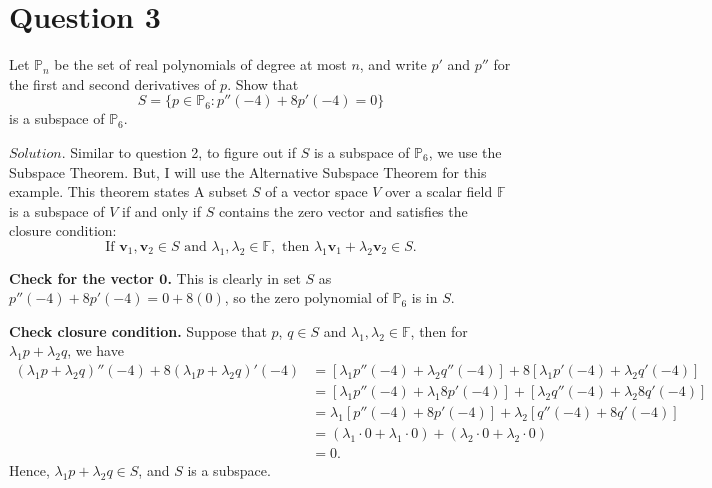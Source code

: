 \documentclass{article}
\begin{document}
\section*{Question 3}
Let $\mathbb{P}_n$ be the set of real polynomials of degree
at most $n$, and write $p'$ and $p''$ for the first and
second derivatives of $p$. Show that
\begin{equation*}
  S = \{p \in \mathbb{P}_6: p''(-4)+8p'(-4)=0\}
\end{equation*}
is a subspace of $\mathbb{P}_6$.

$Solution.$ Similar to question 2, to figure out if $S$ is 
a subspace of $\mathbb{P}_6$, we use the Subspace Theorem. 
But, I will use the Alternative Subspace Theorem for this example.
This theorem states A subset $S$ of a vector space $V$ over a 
scalar field $\mathbb{F}$ is a subspace of $V$ if and only if
$S$ contains the zero vector and satisfies the closure condition:
\begin{equation*}
  \text{If } \mathbf{v}_1,\mathbf{v}_2 \in S \text{ and } \lambda_1,\lambda_2 \in \mathbb{F},
  \text{ then } \lambda_1 \mathbf{v}_1 + \lambda_2 \mathbf{v}_2 \in S.
\end{equation*}

\textbf{Check for the vector $\mathbf{0}$.} This is clearly in 
set $S$ as $p''(-4) + 8p'(-4) = 0 + 8(0)$, so the zero polynomial of 
$\mathbb{P}_6$ is in $S$.

\textbf{Check closure condition.} Suppose that $p$, $q \in S$ 
and $\lambda_1,\lambda_2 \in \mathbb{F}$, then for 
$\lambda_1 p + \lambda_2 q$, we have
\begin{align*}
  (\lambda_1 p + \lambda_2 q)''(-4) + 8(\lambda_1 p + \lambda_2 q)'(-4)&= 
  [\lambda_1 p''(-4) + \lambda_2 q''(-4)] +
  8[\lambda_1 p'(-4) + \lambda_2 q'(-4)] \\ &=
  [\lambda_1 p''(-4) + \lambda_1 8p'(-4)] +
  [\lambda_2 q''(-4) + \lambda_2 8q'(-4)] \\ &=
  \lambda_1 [p''(-4) + 8p'(-4)] +
  \lambda_2 [q''(-4) + 8q'(-4)] \\ &=
  (\lambda_1 \cdot 0 + \lambda_1 \cdot 0) +
  (\lambda_2 \cdot 0 + \lambda_2 \cdot 0) \\ &= 0.
\end{align*}
Hence, $\lambda_1 p + \lambda_2 q \in S$, and $S$ is a subspace. 
\end{document}
